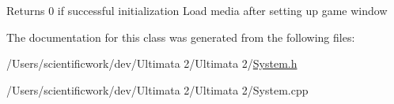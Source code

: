 Returns 0 if successful initialization Load media after setting up game window

The documentation for this class was generated from the following files\+:\begin{DoxyCompactItemize}
\item 
/\+Users/scientificwork/dev/\+Ultimata 2/\+Ultimata 2/\hyperlink{_system_8h}{System.\+h}\item 
/\+Users/scientificwork/dev/\+Ultimata 2/\+Ultimata 2/System.\+cpp\end{DoxyCompactItemize}
